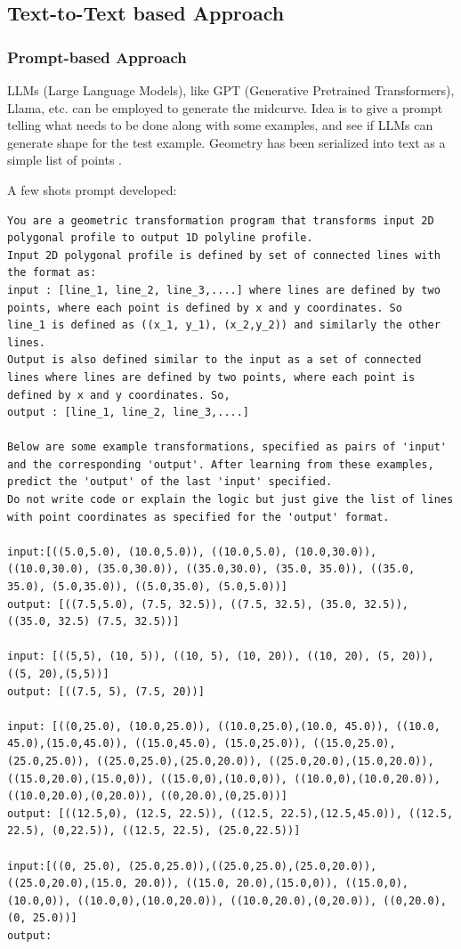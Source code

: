 \documentclass[10pt, conference]{IEEEtran}
\begin{document}
\subsection{Text-to-Text  based Approach}
\label{subsec:7}    
    
\subsubsection{Prompt-based Approach}
\label{subsubsec:1} 
LLMs (Large Language Models), like GPT (Generative Pretrained Transformers), Llama, etc. can be employed to generate the midcurve. Idea is to give a prompt telling what needs to be done along with some examples, and see if LLMs can generate shape for the test example. Geometry has been serialized into text as a simple list of points \cite{kulkarni2023geometry}.

A few shots prompt developed:

\begin{lstlisting}[basicstyle=\tiny, breaklines=true, breakatwhitespace=true,label=lst:python]
You are a geometric transformation program that transforms input 2D polygonal profile to output 1D polyline profile. 
Input 2D polygonal profile is defined by set of connected lines with the format as:
input : [line_1, line_2, line_3,....] where lines are defined by two points, where each point is defined by x and y coordinates. So
line_1 is defined as ((x_1, y_1), (x_2,y_2)) and similarly the other lines.
Output is also defined similar to the input as a set of connected lines where lines are defined by two points, where each point is defined by x and y coordinates. So,
output : [line_1, line_2, line_3,....]

Below are some example transformations, specified as pairs of 'input' and the corresponding 'output'. After learning from these examples, predict the 'output' of the last 'input' specified.
Do not write code or explain the logic but just give the list of lines with point coordinates as specified for the 'output' format.

input:[((5.0,5.0), (10.0,5.0)), ((10.0,5.0), (10.0,30.0)), ((10.0,30.0), (35.0,30.0)), ((35.0,30.0), (35.0, 35.0)), ((35.0, 35.0), (5.0,35.0)), ((5.0,35.0), (5.0,5.0))]
output: [((7.5,5.0), (7.5, 32.5)), ((7.5, 32.5), (35.0, 32.5)), ((35.0, 32.5) (7.5, 32.5))]

input: [((5,5), (10, 5)), ((10, 5), (10, 20)), ((10, 20), (5, 20)), ((5, 20),(5,5))]
output: [((7.5, 5), (7.5, 20))]

input: [((0,25.0), (10.0,25.0)), ((10.0,25.0),(10.0, 45.0)), ((10.0, 45.0),(15.0,45.0)), ((15.0,45.0), (15.0,25.0)), ((15.0,25.0),(25.0,25.0)), ((25.0,25.0),(25.0,20.0)), ((25.0,20.0),(15.0,20.0)), ((15.0,20.0),(15.0,0)), ((15.0,0),(10.0,0)), ((10.0,0),(10.0,20.0)), ((10.0,20.0),(0,20.0)), ((0,20.0),(0,25.0))]
output: [((12.5,0), (12.5, 22.5)), ((12.5, 22.5),(12.5,45.0)), ((12.5, 22.5), (0,22.5)), ((12.5, 22.5), (25.0,22.5))]

input:[((0, 25.0), (25.0,25.0)),((25.0,25.0),(25.0,20.0)), ((25.0,20.0),(15.0, 20.0)), ((15.0, 20.0),(15.0,0)), ((15.0,0),(10.0,0)), ((10.0,0),(10.0,20.0)), ((10.0,20.0),(0,20.0)), ((0,20.0),(0, 25.0))]
output:
\end{lstlisting}
\end{document}
